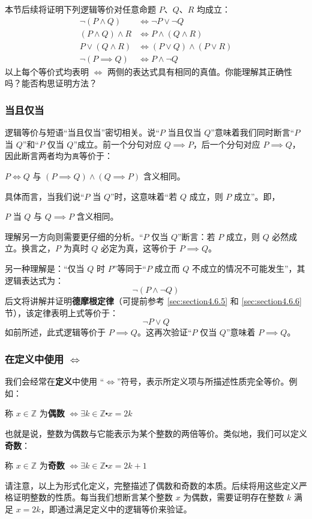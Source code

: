 \begin{example}
    本节后续将证明下列逻辑等价对任意命题 $P$、$Q$、$R$ 均成立：
    \begin{align*}
        \neg(P \land Q) &\iff \neg P \lor \neg Q \\
        (P \land Q) \land R &\iff P \land (Q \land R) \\
        P \lor (Q \land R) &\iff (P \lor Q) \land (P \lor R) \\
        \neg (P \implies Q) &\iff P \land \neg Q
    \end{align*}
    以上每个等价式均表明 $\iff$ 两侧的表达式具有相同的真值。你能理解其正确性吗？能否构思证明方法？
\end{example}

\subsubsection*{当且仅当}

逻辑等价与短语``当且仅当''密切相关。说``$P$ 当且仅当 $Q$''意味着我们同时断言``$P$ 当 $Q$''和``$P$ 仅当 $Q$''成立。前一个分句对应 $Q \implies P$，后一个分句对应 $P \implies Q$，因此断言两者均为\verb|真|等价于：
\begin{center}
    $P \iff Q$ 与 $(P \implies Q) \land (Q \implies P)$ 含义相同。
\end{center}

具体而言，当我们说``$P$ 当 $Q$''时，这意味着``若 $Q$ 成立，则 $P$ 成立''。即，
\begin{center}
    $P$ 当 $Q$ 与 $Q \implies P$ 含义相同。
\end{center}

理解另一方向则需要更仔细的分析。``$P$ 仅当 $Q$''断言：若 $P$ 成立，则 $Q$ 必然成立。换言之，$P$ 为真时 $Q$ 必定为真，这等价于 $P \implies Q$。

另一种理解是：``仅当 $Q$ 时 $P$''等同于``$P$ 成立而 $Q$ 不成立的情况不可能发生''，其逻辑表达式为：
\[\neg(P \land \neg Q)\]
后文将讲解并证明\textbf{德摩根定律}（可提前参考 \ref{sec:section4.6.5} 和 \ref{sec:section4.6.6} 节），该定律表明上式等价于：
\[\neg P \lor Q\]
如前所述，此式逻辑等价于 $P \implies Q$。这再次验证``$P$ 仅当 $Q$''意味着 $P \implies Q$。

\subsubsection*{在定义中使用 $\iff$}

我们会经常在\textbf{定义}中使用 ``$\iff$''符号，表示所定义项与所描述性质完全等价。例如：
\begin{center}
    称 $x \in \mathbb{Z}$ 为\textbf{偶数} $\iff \exists k \in \mathbb{Z} \centerdot x = 2k$
\end{center}
也就是说，整数为偶数与它能表示为某个整数的两倍等价。类似地，我们可以定义\textbf{奇数}：
\begin{center}
    称 $x \in \mathbb{Z}$ 为\textbf{奇数} $\iff \exists k \in \mathbb{Z} \centerdot x = 2k+1$
\end{center}
请注意，以上为形式化定义，完整描述了偶数和奇数的本质。后续将用这些定义严格证明整数的性质。每当我们想断言某个整数 $x$ 为偶数，需要证明存在整数 $k$ 满足 $x = 2k$，即通过满足定义中的逻辑等价来验证。

